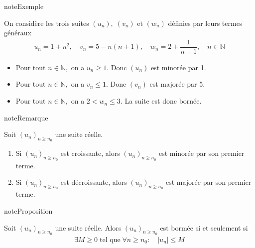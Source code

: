\documentclass[letterpaper,10pt,french]{jupyterBook}
\begin{document}
\begin{sphinxadmonition}{note}{Exemple}

\sphinxAtStartPar
On considère les trois suites \((u_n),\;(v_n)\) et \((w_n)\) définies par leurs termes généraux
\begin{equation*}
\begin{split}
u_n=1+n^2,\quad v_n=5-n(n+1),\quad w_n=2+\dfrac{1}{n+1},\quad n\in \mathbb{N}
\end{split}
\end{equation*}\begin{itemize}
\item {} 
\sphinxAtStartPar
Pour tout \(n\in \mathbb{N},\) on a \(u_n\geq1.\) Donc \((u_n)\) est minorée par 1.

\item {} 
\sphinxAtStartPar
Pour tout \(n\in \mathbb{N},\) on a \(v_n\leq1.\) Donc \((v_n)\) est majorée par 5.

\item {} 
\sphinxAtStartPar
Pour tout \(n\in \mathbb{N},\) on a \(2<w_n\leq 3.\) La suite est donc bornée.

\end{itemize}
\end{sphinxadmonition}

\begin{sphinxadmonition}{note}{Remarque}

\sphinxAtStartPar
Soit \((u_n)_{n\geq n_0}\) une suite réelle.
\begin{enumerate}
%
\item {} 
\sphinxAtStartPar
Si \((u_n)_{n\geq n_0}\) est croissante, alors \((u_n)_{n\geq n_0}\) est minorée par son premier terme.

\item {} 
\sphinxAtStartPar
Si \((u_n)_{n\geq n_0}\) est décroissante, alors \((u_n)_{n\geq n_0}\) est majorée par son premier terme.

\end{enumerate}
\end{sphinxadmonition}

\begin{sphinxadmonition}{note}{Proposition}

\sphinxAtStartPar
Soit \((u_n)_{n\geq n_0}\) une suite réelle. Alors \((u_n)_{n\geq n_0}\) est bormée si et seulement si
\begin{equation*}
\begin{split}
\exists M\geq0\;\mbox{tel que}\;\forall n\geq n_0:\quad |u_n|\leq M
\end{split}
\end{equation*}\end{sphinxadmonition}
\end{document}
